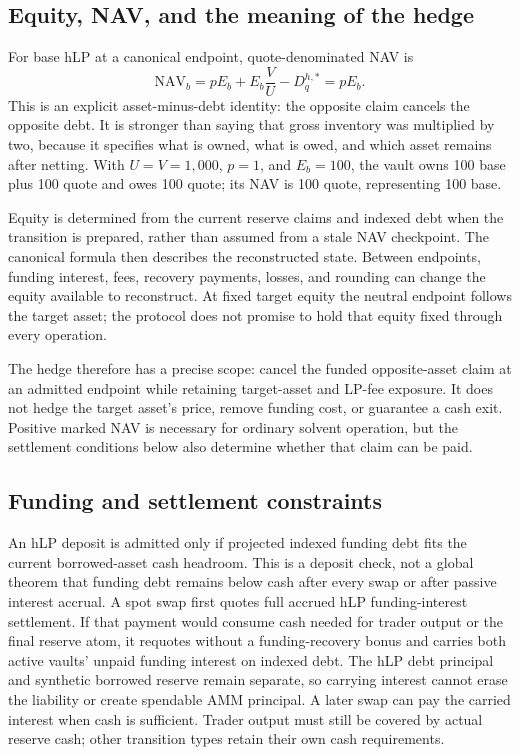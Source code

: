 \subsection{Equity, NAV, and the meaning of the hedge}

For base hLP at a canonical endpoint, quote-denominated NAV is
\begin{equation}
\mathrm{NAV}_b=pE_b+E_b\frac VU-D_q^{h,*}=pE_b.
\label{eq:hlp-nav}
\end{equation}
This is an explicit asset-minus-debt identity: the opposite claim cancels the opposite debt. It is stronger than saying that gross inventory was multiplied by two, because it specifies what is owned, what is owed, and which asset remains after netting. With $U=V=1{,}000$, $p=1$, and $E_b=100$, the vault owns 100 base plus 100 quote and owes 100 quote; its NAV is 100 quote, representing 100 base.

Equity is determined from the current reserve claims and indexed debt when the transition is prepared, rather than assumed from a stale NAV checkpoint. The canonical formula then describes the reconstructed state. Between endpoints, funding interest, fees, recovery payments, losses, and rounding can change the equity available to reconstruct. At fixed target equity the neutral endpoint follows the target asset; the protocol does not promise to hold that equity fixed through every operation.

The hedge therefore has a precise scope: cancel the funded opposite-asset claim at an admitted endpoint while retaining target-asset and LP-fee exposure. It does not hedge the target asset's price, remove funding cost, or guarantee a cash exit. Positive marked NAV is necessary for ordinary solvent operation, but the settlement conditions below also determine whether that claim can be paid.

\subsection{Funding and settlement constraints}

An hLP deposit is admitted only if projected indexed funding debt fits the current borrowed-asset cash headroom. This is a deposit check, not a global theorem that funding debt remains below cash after every swap or after passive interest accrual. A spot swap first quotes full accrued hLP funding-interest settlement. If that payment would consume cash needed for trader output or the final reserve atom, it requotes without a funding-recovery bonus and carries both active vaults' unpaid funding interest on indexed debt. The hLP debt principal and synthetic borrowed reserve remain separate, so carrying interest cannot erase the liability or create spendable AMM principal. A later swap can pay the carried interest when cash is sufficient. Trader output must still be covered by actual reserve cash; other transition types retain their own cash requirements.


